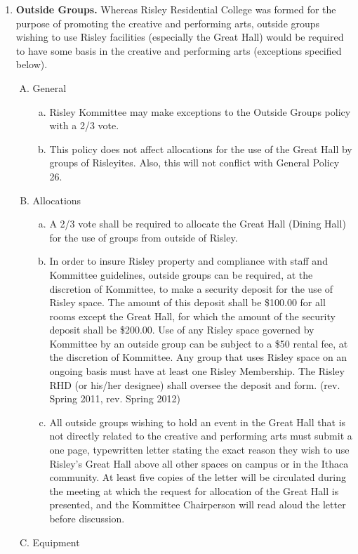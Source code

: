 \documentclass[12pt]{article}
\begin{document}
\begin{enumerate}[1.]
\item \textbf{Outside Groups.} Whereas Risley Residential College was formed for the purpose of promoting the creative and performing arts, outside groups wishing to use Risley facilities (especially the Great Hall) would be required to have some basis in the creative and performing arts (exceptions specified below).
\begin{enumerate}[A.]
\item General
\begin{enumerate}[a.]
\item Risley Kommittee may make exceptions to the Outside Groups policy with a 2/3 vote. 
\item This policy does not affect allocations for the use of the Great Hall by groups of Risleyites. Also, this will not conflict with General Policy 26. 
\end{enumerate}
\item Allocations 
\begin{enumerate}[a.]
\item A 2/3 vote shall be required to allocate the Great Hall (Dining Hall) for the use of groups from outside of Risley.
\item In order to insure Risley property and compliance with staff and Kommittee guidelines, outside groups can be required, at the discretion of Kommittee, to make a security deposit for the use of Risley space. The amount of this deposit shall be \$100.00 for all rooms except the Great Hall, for which the amount of the security deposit shall be \$200.00. Use of any Risley space governed by Kommittee by an outside group can be subject to a \$50 rental fee, at the discretion of Kommittee. Any group that uses Risley space on an ongoing basis must have at least one Risley Membership. The Risley RHD (or his/her designee) shall oversee the deposit and form. (rev. Spring 2011, rev. Spring 2012) 
\item All outside groups wishing to hold an event in the Great Hall that is not directly related to the creative and performing arts must submit a one page, typewritten letter stating the exact reason they wish to use Risley's Great Hall above all other spaces on campus or in the Ithaca community. At least five copies of the letter will be circulated during the meeting at which the request for allocation of the Great Hall is presented, and the Kommittee Chairperson will read aloud the letter before discussion. 
\end{enumerate}
\item Equipment 

\end{enumerate}
\end{enumerate}
\end{document}
